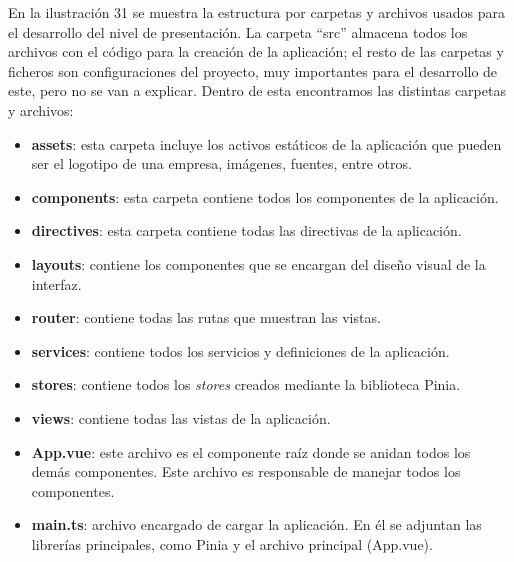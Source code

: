 

En la ilustración 31 se muestra la estructura por carpetas y archivos usados para el desarrollo del nivel de presentación. La carpeta ``src'' almacena todos los archivos con el código para la creación de la aplicación; el resto de las carpetas y ficheros son configuraciones del proyecto, muy importantes para el desarrollo de este, pero no se van a explicar. Dentro de esta encontramos las distintas carpetas y archivos:

\begin{itemize}
\item \textbf{assets}: esta carpeta incluye los activos estáticos de la aplicación que pueden ser el logotipo de una empresa, imágenes, fuentes, entre otros.
\item \textbf{components}: esta carpeta contiene todos los componentes de la aplicación.
\item \textbf{directives}: esta carpeta contiene todas las directivas de la aplicación.
\item \textbf{layouts}: contiene los componentes que se encargan del diseño visual de la interfaz.
\item \textbf{router}: contiene todas las rutas que muestran las vistas.
\item \textbf{services}: contiene todos los servicios y definiciones de la aplicación.
\item \textbf{stores}: contiene todos los \textit{stores} creados mediante la biblioteca Pinia.
\item \textbf{views}: contiene todas las vistas de la aplicación.
\item \textbf{App.vue}: este archivo es el componente raíz donde se anidan todos los demás componentes. Este archivo es responsable de manejar todos los componentes.
\item \textbf{main.ts}: archivo encargado de cargar la aplicación. En él se adjuntan las librerías principales, como Pinia y el archivo principal (App.vue).
\end{itemize}

